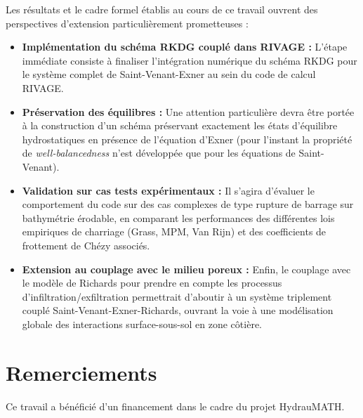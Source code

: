\documentclass[11pt, a4paper, oneside]{report}
\begin{document}
Les résultats et le cadre formel établis au cours de ce travail ouvrent des perspectives d'extension particulièrement prometteuses :
\begin{itemize}
    \item \textbf{Implémentation du schéma RKDG couplé dans RIVAGE :} L'étape immédiate consiste à finaliser l'intégration numérique du schéma RKDG pour le système complet de Saint-Venant-Exner au sein du code de calcul RIVAGE.
    \item \textbf{Préservation des équilibres :} Une attention particulière devra être portée à la construction d'un schéma préservant exactement les états d'équilibre hydrostatiques en présence de l'équation d'Exner (pour l'instant la propriété de \textit{well-balancedness} n'est développée que pour les équations de Saint-Venant).
    \item \textbf{Validation sur cas tests expérimentaux :} Il s'agira d'évaluer le comportement du code sur des cas complexes de type rupture de barrage sur bathymétrie érodable, en comparant les performances des différentes lois empiriques de charriage (Grass, MPM, Van Rijn) et des coefficients de frottement de Chézy associés.
    \item \textbf{Extension au couplage avec le milieu poreux :} Enfin, le couplage avec le modèle de Richards pour prendre en compte les processus d'infiltration/exfiltration permettrait d'aboutir à un système triplement couplé Saint-Venant-Exner-Richards, ouvrant la voie à une modélisation globale des interactions surface-sous-sol en zone côtière.
\end{itemize}

\section*{Remerciements}

Ce travail a bénéficié d'un financement dans le cadre du projet HydrauMATH.



\end{document}
